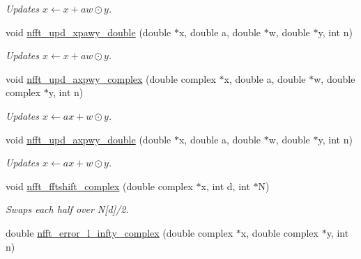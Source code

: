 \begin{CompactItemize}
\begin{CompactList}\small\item\em Updates $x \leftarrow x + a w\odot y$. \item\end{CompactList}\item 
\hypertarget{group__nfftutil_ga33}{
void \hyperlink{group__nfftutil_ga33}{nfft\_\-upd\_\-xpawy\_\-double} (double $\ast$x, double a, double $\ast$w, double $\ast$y, int n)}
\label{group__nfftutil_ga33}

\begin{CompactList}\small\item\em Updates $x \leftarrow x + a w\odot y$. \item\end{CompactList}\item 
\hypertarget{group__nfftutil_ga34}{
void \hyperlink{group__nfftutil_ga34}{nfft\_\-upd\_\-axpwy\_\-complex} (double complex $\ast$x, double a, double $\ast$w, double complex $\ast$y, int n)}
\label{group__nfftutil_ga34}

\begin{CompactList}\small\item\em Updates $x \leftarrow a x + w\odot y$. \item\end{CompactList}\item 
\hypertarget{group__nfftutil_ga35}{
void \hyperlink{group__nfftutil_ga35}{nfft\_\-upd\_\-axpwy\_\-double} (double $\ast$x, double a, double $\ast$w, double $\ast$y, int n)}
\label{group__nfftutil_ga35}

\begin{CompactList}\small\item\em Updates $x \leftarrow a x + w\odot y$. \item\end{CompactList}\item 
\hypertarget{group__nfftutil_ga36}{
void \hyperlink{group__nfftutil_ga36}{nfft\_\-fftshift\_\-complex} (double complex $\ast$x, int d, int $\ast$N)}
\label{group__nfftutil_ga36}

\begin{CompactList}\small\item\em Swaps each half over N\mbox{[}d\mbox{]}/2. \item\end{CompactList}\item 
\hypertarget{group__nfftutil_ga37}{
double \hyperlink{group__nfftutil_ga37}{nfft\_\-error\_\-l\_\-infty\_\-complex} (double complex $\ast$x, double complex $\ast$y, int n)}
\label{group__nfftutil_ga37}


\end{CompactItemize}

